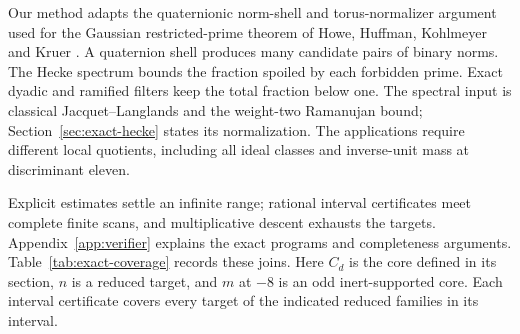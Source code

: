 Our method adapts the quaternionic norm-shell and torus-normalizer
argument used for the Gaussian restricted-prime theorem of Howe,
Huffman, Kohlmeyer and Kruer \cite[Theorem~1.1]{Euler}.  A quaternion
shell produces many candidate pairs of binary norms.  The Hecke
spectrum bounds the fraction spoiled by each forbidden prime.
Exact dyadic and ramified filters keep the total fraction below one.
The spectral input is classical Jacquet--Langlands and the weight-two
Ramanujan bound; Section~\ref{sec:exact-hecke} states its normalization.
The applications require different local quotients, including all ideal
classes and inverse-unit mass at discriminant eleven.

Explicit estimates settle an infinite range; rational interval
certificates meet complete finite scans, and multiplicative descent
exhausts the targets. Appendix~\ref{app:verifier} explains the exact
programs and completeness arguments.
Table~\ref{tab:exact-coverage} records these joins. Here \(C_d\) is
the core defined in its section, \(n\) is a reduced target, and
\(m\) at \(-8\) is an odd inert-supported core. Each interval
certificate covers every target of the indicated reduced families in its interval.

